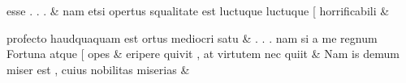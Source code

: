 \documentclass[12pt,onecolumn,twoside,a4paper]{memoir}
\begin{document}
\begin{pairs}
\begin{Leftside}
                              esse
                              .
                              .
                              . \&
                         \stanza {}
                     nam
                              etsi
                              opertus
                              squalitate
                              est
                              luctuque
                              {luctuque}
                              [
                              horrificabili \&
                         \stanza {}
                     
                              profecto
                              haudquaquam
                              est
                              ortus
                              mediocri
                              satu \&
                         \stanza {}.
                              .
                              .
                              nam
                              si
                              a
                              me
                              regnum
                              Fortuna
                              atque
                              [
                              opes & 
                     eripere
                              quivit
                              ,
                              at
                              virtutem
                              nec
                              quiit \&
                         \stanza {}Nam
                              is
                              demum
                              miser
                              est
                              ,
                              cuius
                              nobilitas
                              miserias & 
                     

\end{Leftside}
\end{pairs}
\end{document}
